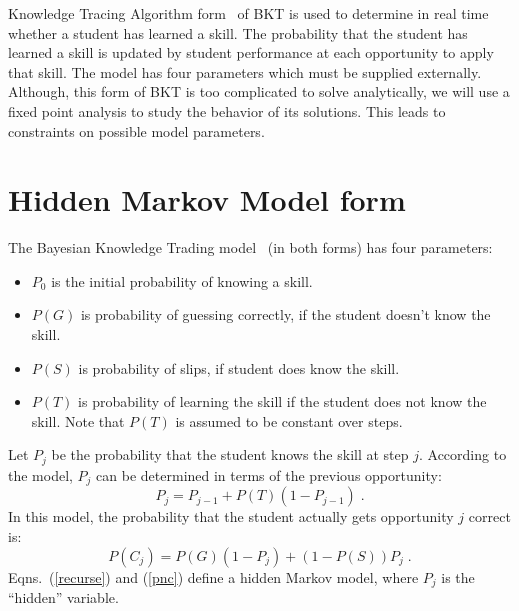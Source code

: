 \documentclass{acmlarge-edm}
\begin{document}

Knowledge Tracing Algorithm form~\cite{corbett_knowledge_1994} 
of BKT is used to 
determine in real time whether a student has learned a skill.
The probability that the student has learned a skill is 
updated by student performance at each opportunity to apply
that skill.  The model has four parameters which must be 
supplied externally.  Although, this form of BKT is too complicated
to solve analytically, we will use a fixed point analysis to
study the behavior of its solutions.  This leads to constraints on possible model parameters.

\section{Hidden Markov Model form}

The Bayesian Knowledge Trading model~\cite{corbett_knowledge_1994}
(in both forms) has four parameters:
%
\begin{itemize}
   \item $P_0$ is the initial probability of knowing a skill.
   \item $P(G)$ is probability of guessing correctly, if the student        
         doesn't know the skill.
   \item $P(S)$ is probability of slips, if student does know the skill.
   \item $P(T)$ is probability of learning the skill if the student 
         does not know the skill.  Note that $P(T)$ is assumed to 
         be constant over steps.
\end{itemize}
%
Let $P_j$ be the probability that the student knows the skill at 
step $j$. According to the model,  $P_j$ can
be determined in terms of the previous opportunity:
%
\begin{equation}
          P_j = P_{j-1} + P(T)\left(1-P_{j-1}\right)  \; . \label{recurse}
\end{equation}
%
In this model, the probability that the student actually gets
opportunity $j$ correct is:
%
\begin{equation}
         P(C_j) = P(G)\left(1-P_j\right) + \left(1-P(S)\right) P_j \; . 
          \label{pnc}
\end{equation}
%
Eqns.~(\ref{recurse}) and
(\ref{pnc}) define a hidden Markov model, where $P_j$ is the 
``hidden'' variable.
\end{document}
